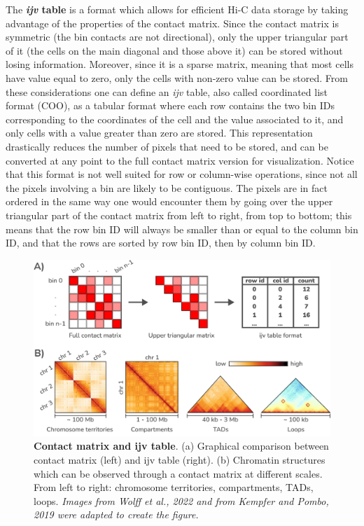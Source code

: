 The \textbf{\emph{ijv} table} is a format which allows for efficient Hi-C data storage by taking advantage of the properties of the contact matrix. Since the contact matrix is symmetric (the bin contacts are not directional), only the upper triangular part of it (the cells on the main diagonal and those above it) can be stored without losing information. Moreover, since it is a sparse matrix, meaning that most cells have value equal to zero, only the cells with non-zero value can be stored. From these considerations one can define an \emph{ijv} table, also called coordinated list format (COO), as a tabular format where each row contains the two bin IDs corresponding to the coordinates of the cell and the value associated to it, and only cells with a value greater than zero are stored. This representation drastically reduces the number of pixels that need to be stored, and can be converted at any point to the full contact matrix version for visualization. Notice that this format is not well suited for row or column-wise operations, since not all the pixels involving a bin are likely to be contiguous. The pixels are in fact ordered in the same way one would encounter them by going over the upper triangular part of the contact matrix from left to right, from top to bottom; this means that the row bin ID will always be smaller than or equal to the column bin ID, and that the rows are sorted by row bin ID, then by column bin ID.

\begin{figure}[ht]
  \centering
  \includegraphics[width=1\textwidth]{contact_matrix.png}
  \caption{\textbf{Contact matrix and ijv table}. (a) Graphical comparison between contact matrix (left) and ijv table (right). (b) Chromatin structures which can be observed through a contact matrix at different scales. From left to right: chromosome territories, compartments, TADs, loops. \textit{Images from Wolff et al., 2022\cite{loopshic2022} and from Kempfer and Pombo, 2019\cite{chromatinorganization2019} were adapted to create the figure.}}
  \label{fig:contacts}
\end{figure}

